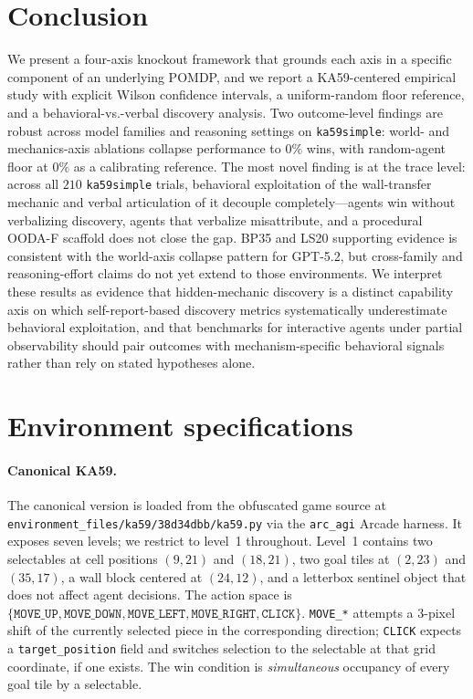 \documentclass{article}
\begin{document}
\section{Conclusion}
We present a four-axis knockout framework that grounds each axis in a specific component of an underlying POMDP, and we report a KA59-centered empirical study with explicit Wilson confidence intervals, a uniform-random floor reference, and a behavioral-vs.-verbal discovery analysis. Two outcome-level findings are robust across model families and reasoning settings on \texttt{ka59simple}: world- and mechanics-axis ablations collapse performance to $0\%$ wins, with random-agent floor at $0\%$ as a calibrating reference. The most novel finding is at the trace level: across all $210$ \texttt{ka59simple} trials, behavioral exploitation of the wall-transfer mechanic and verbal articulation of it decouple completely---agents win without verbalizing discovery, agents that verbalize misattribute, and a procedural OODA-F scaffold does not close the gap. BP35 and LS20 supporting evidence is consistent with the world-axis collapse pattern for GPT-5.2, but cross-family and reasoning-effort claims do not yet extend to those environments. We interpret these results as evidence that hidden-mechanic discovery is a distinct capability axis on which self-report-based discovery metrics systematically underestimate behavioral exploitation, and that benchmarks for interactive agents under partial observability should pair outcomes with mechanism-specific behavioral signals rather than rely on stated hypotheses alone.




\appendix

\section{Environment specifications}
\label{app:envs}
\paragraph{Canonical KA59.}
The canonical version is loaded from the obfuscated game source at \texttt{environment\_files/ka59/38d34dbb/ka59.py} via the \texttt{arc\_agi} Arcade harness. It exposes seven levels; we restrict to level~1 throughout. Level~1 contains two selectables at cell positions $(9, 21)$ and $(18, 21)$, two goal tiles at $(2, 23)$ and $(35, 17)$, a wall block centered at $(24, 12)$, and a letterbox sentinel object that does not affect agent decisions. The action space is $\{\texttt{MOVE\_UP}, \texttt{MOVE\_DOWN}, \texttt{MOVE\_LEFT}, \texttt{MOVE\_RIGHT}, \texttt{CLICK}\}$. \texttt{MOVE\_*} attempts a $3$-pixel shift of the currently selected piece in the corresponding direction; \texttt{CLICK} expects a \texttt{target\_position} field and switches selection to the selectable at that grid coordinate, if one exists. The win condition is \emph{simultaneous} occupancy of every goal tile by a selectable.
\end{document}
